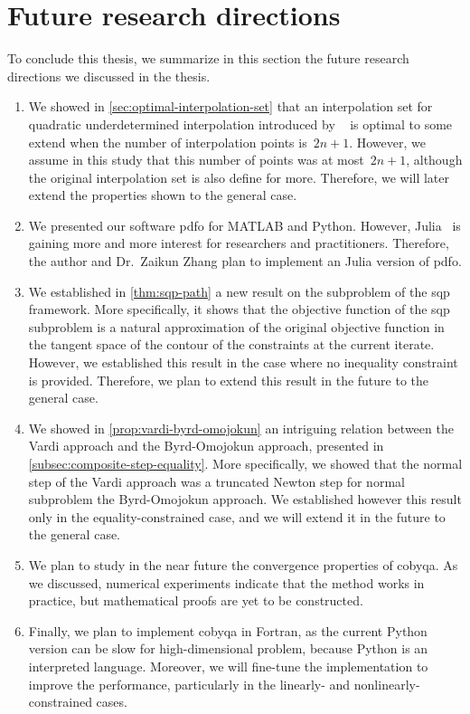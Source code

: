 \section{Future research directions}

To conclude this thesis, we summarize in this section the future research directions we discussed in the thesis.

\begin{enumerate}
    \item We showed in \cref{sec:optimal-interpolation-set} that an interpolation set for quadratic underdetermined interpolation introduced by \citeauthor{Powell_2006}~\cite{Powell_2006} is optimal to some extend when the number of interpolation points is~$2n + 1$.
    However, we assume in this study that this number of points was at most~$2n + 1$, although the original interpolation set is also define for more.
    Therefore, we will later extend the properties shown to the general case.
    \item We presented our software \gls{pdfo} for MATLAB and Python.
    However, Julia~\cite{Bezanson_Etal_2017} is gaining more and more interest for researchers and practitioners.
    Therefore, the author and Dr.\ Zaikun Zhang plan to implement an Julia version of \gls{pdfo}.
    \item We established in \cref{thm:sqp-path} a new result on the subproblem of the \gls{sqp} framework.
    More specifically, it shows that the objective function of the \gls{sqp} subproblem is a natural approximation of the original objective function in the tangent space of the contour of the constraints at the current iterate.
    However, we established this result in the case where no inequality constraint is provided.
    Therefore, we plan to extend this result in the future to the general case.
    \item We showed in \cref{prop:vardi-byrd-omojokun} an intriguing relation between the Vardi approach and the Byrd-Omojokun approach, presented in \cref{subsec:composite-step-equality}.
    More specifically, we showed that the normal step of the Vardi approach was a truncated Newton step for normal subproblem the Byrd-Omojokun approach.
    We established however this result only in the equality-constrained case, and we will extend it in the future to the general case.
    \item We plan to study in the near future the convergence properties of \gls{cobyqa}.
    As we discussed, numerical experiments indicate that the method works in practice, but mathematical proofs are yet to be constructed.
    \item Finally, we plan to implement \gls{cobyqa} in Fortran, as the current Python version can be slow for high-dimensional problem, because Python is an interpreted language.
    Moreover, we will fine-tune the implementation to improve the performance, particularly in the linearly- and nonlinearly-constrained cases.
\end{enumerate}

